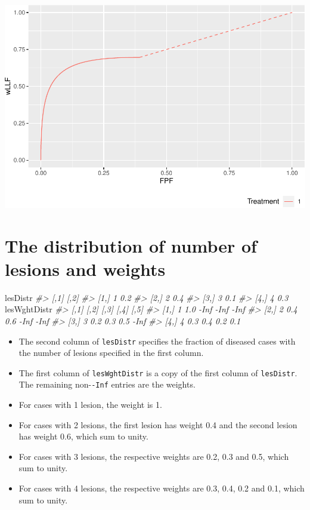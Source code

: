\documentclass[
]{book}
\newenvironment{Shaded}{\begin{snugshade}}{\end{snugshade}}
\newcommand{\CommentTok}[1]{\textcolor[rgb]{0.56,0.35,0.01}{\textit{#1}}}
\newcommand{\NormalTok}[1]{#1}
\providecommand{\tightlist}{%
  \setlength{\itemsep}{0pt}\setlength{\parskip}{0pt}}
\begin{document}
\includegraphics{19-PlotRsmOpCh_files/figure-latex/unnamed-chunk-3-1.pdf}

\hypertarget{the-distribution-of-number-of-lesions-and-weights}{%
\section{The distribution of number of lesions and weights}\label{the-distribution-of-number-of-lesions-and-weights}}

\begin{Shaded}
\begin{Highlighting}[]
\NormalTok{lesDistr}
\CommentTok{\#\textgreater{}      [,1] [,2]}
\CommentTok{\#\textgreater{} [1,]    1  0.2}
\CommentTok{\#\textgreater{} [2,]    2  0.4}
\CommentTok{\#\textgreater{} [3,]    3  0.1}
\CommentTok{\#\textgreater{} [4,]    4  0.3}
\NormalTok{lesWghtDistr}
\CommentTok{\#\textgreater{}      [,1] [,2] [,3] [,4] [,5]}
\CommentTok{\#\textgreater{} [1,]    1  1.0 {-}Inf {-}Inf {-}Inf}
\CommentTok{\#\textgreater{} [2,]    2  0.4  0.6 {-}Inf {-}Inf}
\CommentTok{\#\textgreater{} [3,]    3  0.2  0.3  0.5 {-}Inf}
\CommentTok{\#\textgreater{} [4,]    4  0.3  0.4  0.2  0.1}
\end{Highlighting}
\end{Shaded}

\begin{itemize}
\tightlist
\item
  The second column of \texttt{lesDistr} specifies the fraction of diseased cases with the number of lesions specified in the first column.
\item
  The first column of \texttt{lesWghtDistr} is a copy of the first column of \texttt{lesDistr}. The remaining non-\texttt{-Inf} entries are the weights.
\item
  For cases with 1 lesion, the weight is 1.
\item
  For cases with 2 lesions, the first lesion has weight 0.4 and the second lesion has weight 0.6, which sum to unity.
\item
  For cases with 3 lesions, the respective weights are 0.2, 0.3 and 0.5, which sum to unity.
\item
  For cases with 4 lesions, the respective weights are 0.3, 0.4, 0.2 and 0.1, which sum to unity.
\end{itemize}
\end{document}
